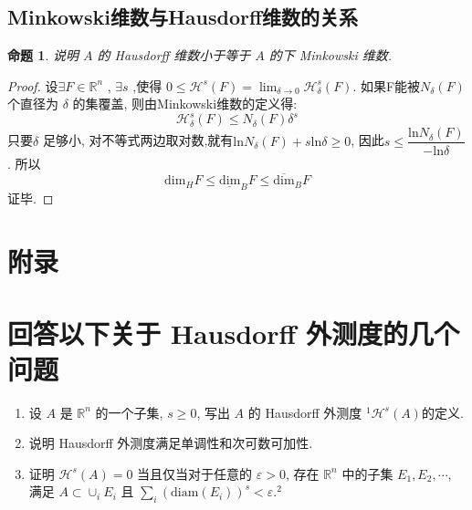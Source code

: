 \documentclass[hyperref,a4paper,UTF8]{ctexart}
\newtheorem{proposition}{{命题}}
\begin{document}
\subsection{Minkowski维数与Hausdorff维数的关系}


\begin{proposition}

  说明 $A$ 的 Hausdorff 维数小于等于 $A$ 的下 Minkowski 维数.
\end{proposition}

\begin{proof}
  设$\exists F \in \mathbb{R}^n$  , $\exists s$ ,使得 $0 \le \mathcal{H}^{s}(F) = \lim_{\delta \rightarrow 0}\mathcal{H}^{s}_{\delta}(F)$. 如果F能被$N_{\delta}(F)$个直径为 $\delta$ 的集覆盖, 则由Minkowski维数的定义得:
  \[ \mathcal{H}^{s}_\delta(F) \leqslant N_{\delta}(F){\delta}^{s} \]
  只要$\delta$ 足够小, 对不等式两边取对数,就有$ \mathrm{ln } N_{\delta}(F) + s \mathrm{ln } \delta \ge 0$, 因此$s \leqslant \dfrac{\mathrm{ln} N_{\delta}(F)}{ - \mathrm{ln} \delta}$. 所以 
  \[
  \mathrm{\mathrm{dim}}_H F \leqslant \underline{\mathrm{dim}}_B F \leqslant \overline{\mathrm{dim}}_B F
  \]
  证毕\cite{2007分形几何}.
\end{proof}

\newpage



  
 

\newpage

\appendix
\section*{附录}


\section*{回答以下关于 Hausdorff 外测度的几个问题}
\begin{enumerate}
  \item 设 $A$ 是 $\mathbb{R}^{n}$ 的一个子集, $s \geqslant 0$, 写出 $A$ 的 Hausdorff 外测度 ${ }^{1} \mathcal{H}^{s}(A)$的定义.

  \item 说明 Hausdorff 外测度满足单调性和次可数可加性.

  \item 证明 $\mathcal{H}^{s}(A)=0$ 当且仅当对于任意的 $\varepsilon>0$, 存在 $\mathbb{R}^{n}$ 中的子集 $E_{1}, E_{2}, \cdots$, 满足 $A \subset \cup_{i} E_{i}$ 且 $\sum_{i}\left(\mathrm{\mathrm{diam}}\left(E_{i}\right)\right)^{s}<\varepsilon .^{2}$

\end{enumerate}
\end{document}
